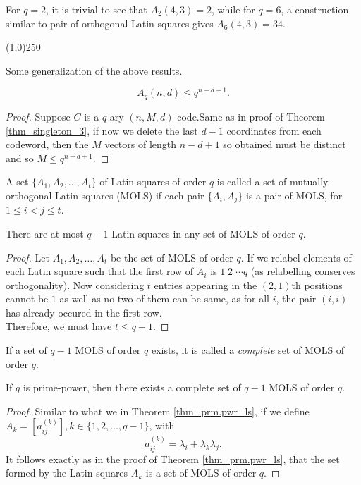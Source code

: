 \documentclass[../main.tex]{subfiles}
\begin{document}
\begin{remark}
	For $q=2$, it is trivial to see that $A_2(4,3)=2$, while for $q=6$, a construction similar to pair of orthogonal Latin squares gives $A_6(4,3)=34$. 
\end{remark}

\begin{center}
\line(1,0){250}
\end{center}

Some generalization of the above results.

\begin{thm}\label{singleton_bound}
	\[
		A_q(n,d) \leq q^{n-d+1}.
	\]	
\end{thm}
\begin{proof}
	Suppose $C$ is a $q$-ary $(n,M,d)$-code.Same as in proof of Theorem \ref{thm_singleton_3}, if now we delete the last $d-1$ coordinates from each codeword, then the $M$ vectors of length $n-d+1$ so obtained must be distinct and so $M \leq q^{n-d+1}$.
\end{proof}

\begin{defn}
	A set $\{A_1,A_2,\ldots,A_t\}$ of Latin squares of order $q$ is called a set of mutually orthogonal Latin squares (MOLS) if each pair $\{A_i,A_j\}$ is a pair of MOLS, for $1\leq i < j\leq t$.	
\end{defn}

\begin{thm}
	There are at most $q-1$ Latin squares in any set of MOLS of order $q$.
\end{thm}

\begin{proof}
	Let $A_1,A_2,\ldots, A_t$ be the set of MOLS of order $q$. If we relabel elements of each Latin square such that the first row of $A_i$ is $1\;2\;\cdots q$ (as relabelling conserves orthogonality). Now considering $t$ entries appearing in the $(2,1)$th positions cannot be $1$ as well as no two of them can be same, as for all $i$, the  pair $(i,i)$ has already occured in the first row.\\
	Therefore, we must have $t\leq q-1$.  
\end{proof}

\begin{defn}
	If a set of $q-1$ MOLS of order $q$ exists, it is called a \emph{complete} set of MOLS of order $q$.
\end{defn}

\begin{thm}
	If $q$ is prime-power, then there exists a complete set of $q-1$ MOLS of order $q$.
\end{thm}
\begin{proof}
	Similar to what we in Theorem \ref{thm_prm.pwr_ls}, if we define $A_k=[a_{ij}^(k)], k\in \{1,2,\ldots,q-1\}$, with 
	\[
		a_{ij}^{(k)} = \lambda_i + \lambda_k \lambda_j.
	\]
	It follows exactly as in the proof of Theorem \ref{thm_prm.pwr_ls}, that the set formed by the Latin squares $A_k$ is a set of MOLS of order $q$.
\end{proof}
\end{document}
